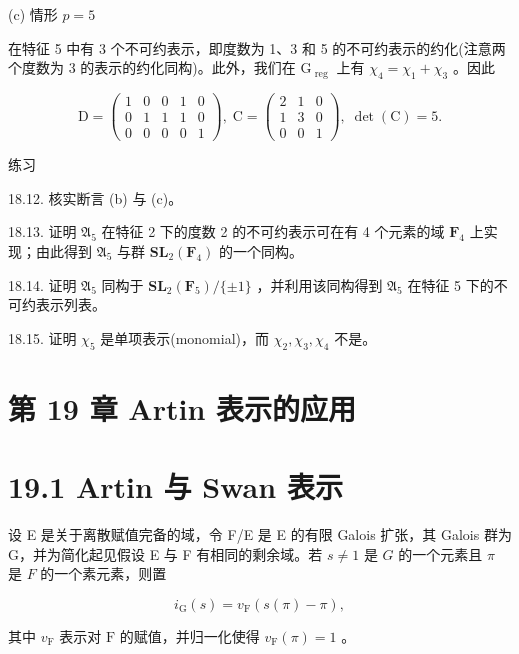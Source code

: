 \documentclass[10pt]{article}
\begin{document}
(c) 情形 \(p = 5\)

在特征 5 中有 3 个不可约表示，即度数为 1、3 和 5 的不可约表示的约化(注意两个度数为 3 的表示的约化同构)。此外，我们在 \({\mathrm{G}}_{\text{ reg }}\) 上有 \({\chi }_{4} = {\chi }_{1} + {\chi }_{3}\) 。因此

\[
\mathrm{D} = \left( \begin{array}{lllll} 1 & 0 & 0 & 1 & 0 \\  0 & 1 & 1 & 1 & 0 \\  0 & 0 & 0 & 0 & 1 \end{array}\right) ,\;\mathrm{C} = \left( \begin{array}{lll} 2 & 1 & 0 \\  1 & 3 & 0 \\  0 & 0 & 1 \end{array}\right) ,\;\det \left( \mathrm{C}\right)  = 5.
\]

练习

18.12. 核实断言 (b) 与 (c)。

18.13. 证明 \({\mathfrak{A}}_{5}\) 在特征 2 下的度数 2 的不可约表示可在有 4 个元素的域 \({\mathbf{F}}_{4}\) 上实现；由此得到 \({\mathfrak{A}}_{5}\) 与群 \({\mathbf{{SL}}}_{2}\left( {\mathbf{F}}_{4}\right)\) 的一个同构。

18.14. 证明 \({\mathfrak{A}}_{5}\) 同构于 \({\mathbf{{SL}}}_{2}\left( {\mathbf{F}}_{5}\right) /\{  \pm  1\}\) ，并利用该同构得到 \({\mathfrak{A}}_{5}\) 在特征 5 下的不可约表示列表。

18.15. 证明 \({\chi }_{5}\) 是单项表示(monomial)，而 \({\chi }_{2},{\chi }_{3},{\chi }_{4}\) 不是。

\section*{第 19 章 Artin 表示的应用}

\section*{19.1 Artin 与 Swan 表示}

设 E 是关于离散赋值完备的域，令 F/E 是 E 的有限 Galois 扩张，其 Galois 群为 G，并为简化起见假设 E 与 F 有相同的剩余域。若 \(s \neq  1\) 是 \(G\) 的一个元素且 \(\pi\) 是 \(F\) 的一个素元素，则置

\[
{i}_{\mathrm{G}}\left( s\right)  = {v}_{\mathrm{F}}\left( {s\left( \pi \right)  - \pi }\right) ,
\]

其中 \({v}_{\mathrm{F}}\) 表示对 \(\mathrm{F}\) 的赋值，并归一化使得 \({v}_{\mathrm{F}}\left( \pi \right)  = 1\) 。
\end{document}
